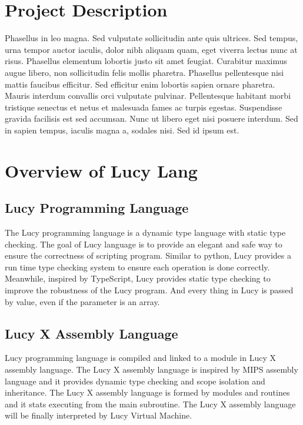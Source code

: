 \section{Project Description}
Phasellus in leo magna. Sed vulputate sollicitudin ante quis ultrices. Sed tempus, urna tempor auctor iaculis, dolor nibh aliquam quam, eget viverra lectus nunc at risus. Phasellus elementum lobortis justo sit amet feugiat. Curabitur maximus augue libero, non sollicitudin felis mollis pharetra. Phasellus pellentesque nisi mattis faucibus efficitur. Sed efficitur enim lobortis sapien ornare pharetra. Mauris interdum convallis orci vulputate pulvinar. Pellentesque habitant morbi tristique senectus et netus et malesuada fames ac turpis egestas. Suspendisse gravida facilisis est sed accumsan. Nunc ut libero eget nisi posuere interdum. Sed in sapien tempus, iaculis magna a, sodales nisi. Sed id ipsum est.


\section{Overview of Lucy Lang}

\subsection{Lucy Programming Language}
The Lucy programming language is a dynamic type language with static type checking. The goal of Lucy language is to provide an elegant and safe way to ensure the correctness of scripting program. Similar to python, Lucy provides a run time type checking system to ensure each operation is done correctly. Meanwhile, inspired by TypeScript, Lucy provides static type checking to improve the robustness of the Lucy program. And every thing in Lucy is passed by value, even if the parameter is an array.

\subsection{Lucy X Assembly Language}
Lucy programming language is compiled and linked to a module in Lucy X assembly language. The Lucy X assembly language is inspired by MIPS assembly language and it provides dynamic type checking and scope isolation and inheritance. The Lucy X assembly language is formed by modules and routines and it stats executing from the main subroutine. The Lucy X assembly language will be finally interpreted by Lucy Virtual Machine.

